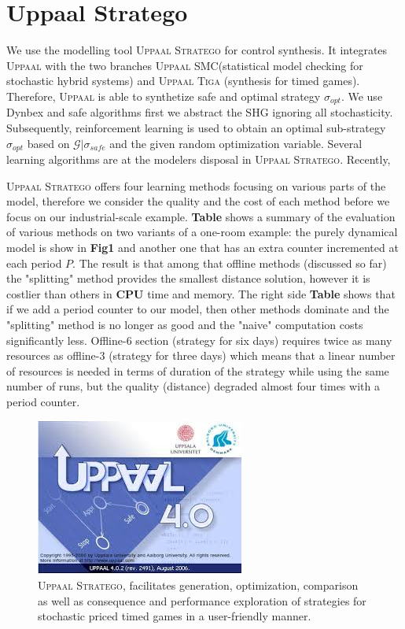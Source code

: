   \section{Uppaal Stratego}     
    \label{sec:uppaalstratego}
      We use the modelling tool \textsc{Uppaal Stratego} for control 
      synthesis. It integrates \textsc{Uppaal} with the two branches
      \textsc{Uppaal SMC}(statistical model checking for stochastic 
      hybrid systems) and \textsc{Uppaal Tiga} (synthesis for timed games).
      Therefore, \textsc{Uppaal} is able to synthetize safe and
      optimal strategy $\sigma_{opt}$. We use Dynbex and safe algorithms
      first we abstract the \ac{SHG} ignoring all stochasticity.
      Subsequently, reinforcement learning is used to obtain an 
      optimal sub-strategy $\sigma_{opt}$ based on $\mathcal{G}|
      \sigma_{safe}$ and the given random optimization variable.
      Several learning algorithms are at the modelers disposal in 
      \textsc{Uppaal Stratego}. Recently, 

      \textsc{Uppaal Stratego} offers four learning methods focusing on various parts of the model,
      therefore we consider the quality and the cost of each method before we focus on our 
      industrial-scale example. \textbf{Table} shows a summary of the evaluation of various 
      methods on two variants of a one-room example: the purely dynamical model is show in \textbf{Fig1}
      and another one that has an extra counter incremented at each period $P$. The result
      is that among that offline methods (discussed so far) the "splitting" method provides 
      the smallest distance solution, however it is costlier than others in \textbf{CPU} time
      and memory. The right side \textbf{Table} shows that if we add a period counter to our
      model, then other methods dominate and the "splitting" method is no longer as good and 
      the "naive" computation costs significantly less. Offline-6 section (strategy for six days)
      requires twice as many resources as offline-3 (strategy for three days) which means 
      that a linear number of resources is needed in terms of duration of the strategy while 
      using the same number of runs, but the quality (distance) degraded almost four times
      with a period counter. 
  
      \begin{figure}[!hbt]
        \centering
        \includegraphics[width=0.4\linewidth]{images/uppaalstratego.jpeg}
        \captionsetup{format=hang}
        \caption{ \textsc{Uppaal Stratego}, facilitates generation, optimization, comparison as well as consequence and performance exploration of strategies for stochastic priced timed games in a user-friendly manner.}
        \label{fig:uppaalstratego}
      \end{figure}


